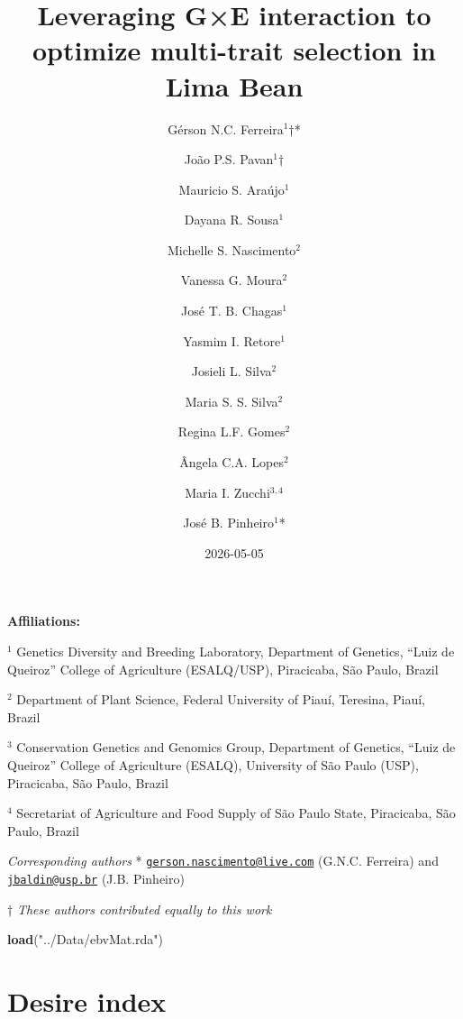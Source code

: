 \documentclass[
  12pt,
]{article}
\title{Leveraging G×E interaction to optimize multi-trait selection in
Lima Bean}
\author{Gérson N.C. Ferreira\(^1\)†* \and João P.S.
Pavan\(^1\)† \and Mauricio S. Araújo\(^1\) \and Dayana R.
Sousa\(^1\) \and Michelle S. Nascimento\(^2\) \and Vanessa G.
Moura\(^2\) \and José T. B. Chagas\(^1\) \and Yasmim I.
Retore\(^1\) \and Josieli L. Silva\(^2\) \and Maria S. S.
Silva\(^2\) \and Regina L.F. Gomes\(^2\) \and Ângela C.A.
Lopes\(^2\) \and Maria I. Zucchi\(^{3,4}\) \and José B. Pinheiro\(^1\)*}
\date{2026-05-05}
\newenvironment{Shaded}{\begin{snugshade}}{\end{snugshade}}
\newcommand{\FunctionTok}[1]{\textcolor[rgb]{0.13,0.29,0.53}{\textbf{#1}}}
\newcommand{\NormalTok}[1]{#1}
\newcommand{\StringTok}[1]{\textcolor[rgb]{0.31,0.60,0.02}{#1}}
\begin{document}
\maketitle

\textbf{Affiliations:}

\textbf{\(^1\)} Genetics Diversity and Breeding Laboratory, Department
of Genetics, ``Luiz de Queiroz'' College of Agriculture (ESALQ/USP),
Piracicaba, São Paulo, Brazil

\textbf{\(^2\)} Department of Plant Science, Federal University of
Piauí, Teresina, Piauí, Brazil

\textbf{\(^3\)} Conservation Genetics and Genomics Group, Department of
Genetics, ``Luiz de Queiroz'' College of Agriculture (ESALQ), University
of São Paulo (USP), Piracicaba, São Paulo, Brazil

\textbf{\(^4\)} Secretariat of Agriculture and Food Supply of São Paulo
State, Piracicaba, São Paulo, Brazil

\vspace{0.5cm}

\emph{Corresponding authors} *
\href{mailto:gerson.nascimento@live.com}{\nolinkurl{gerson.nascimento@live.com}}
(G.N.C. Ferreira) and
\href{mailto:jbaldin@usp.br}{\nolinkurl{jbaldin@usp.br}} (J.B. Pinheiro)

† \emph{These authors contributed equally to this work}

\newpage

\begin{Shaded}
\begin{Highlighting}[]
\FunctionTok{load}\NormalTok{(}\StringTok{"../Data/ebvMat.rda"}\NormalTok{)}
\end{Highlighting}
\end{Shaded}

\section{Desire index}\label{desire-index}
\end{document}
